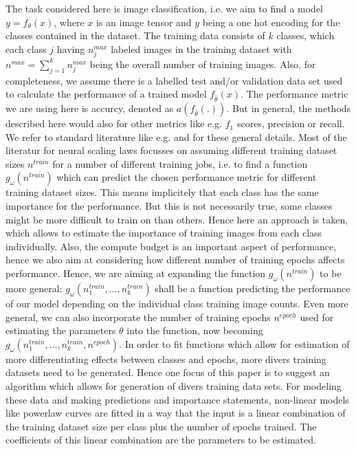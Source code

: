 \documentclass{article} %
\begin{document}
     The task considered here is image classification, i.e. we aim to find a model $y = f_{\theta}(x)$, where $x$ is an image tensor and $y$ being a one hot encoding for the classes contained in the dataset.
     The training data consists of $k$ classes, which each class $j$ having $n_j^{max}$ labeled images in the training dataset with $n^{max} = \sum_{j= 1}^k n_j^{max}$ being the overall number of training images.
     Also, for completeness, we assume there is a labelled test and/or validation data set used to calculate the performance of a trained model $f_{\hat{\theta}}(x)$.
     The performance metric we are using here is accurcy, denoted as $a(f_{\hat{\theta}}(.))$. But in general, the methods described here would also for other metrics like e.g. $f_1$ scores, precision or recall.
     We refer to standard literature like e.g. \cite{Goodfellowetal2016} and \cite{Bishop2006PatternRecog} for these general details.
     Most of the literatur for neural scaling laws focusses on assuming different training dataset sizes $n^{train}$ for a number of different training jobs, i.e. to find a function $g_{\omega}(n^{train})$ which can predict the chosen performance metric for different training dataset sizes. 
     This means implicitely that each class has the same importance for the performance.
     But this is not necessarily true, some classes might be more difficult to train on than others.
     Hence here an approach is taken, which allows to estimate the importance of training images from each class individually.
     Also, the compute budget is an important aspect of performance, hence we also aim at considering how different number of training epochs affects performance.
     Hence, we are aiming at expanding the function $g_{\omega}(n^{train})$ to be more general: $g_{\omega}(n_1^{train}, \dots, n_k^{train})$ shall be a function predicting the performance of our model depending on the individual class training image counts.
     Even more general, we can also incorporate the number of training epochs $n^{epoch}$ used for estimating the parameters $\theta$ into the function, now becoming $g_{\omega}(n_1^{train}, \dots, n_k^{train}, n^{epoch})$.
     In order to fit functions which allow for estimation of more differentiating effects between classes and epochs, more divers training datasets need to be generated.
     Hence one focus of this paper is to suggest an algorithm which allows for generation of divers training data sets.
     For modeling these data and making predictions and importance statements, non-linear models like powerlaw curves are fitted in a way that the input is a linear combination of the training dataset size per class plus the number of epochs trained.
     The coefficients of this linear combination are the parameters to be estimated.
\end{document}
